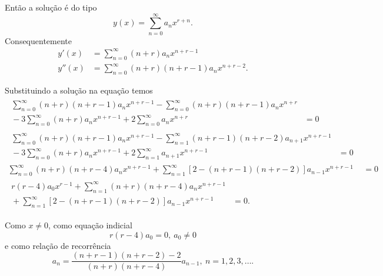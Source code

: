 \documentclass[a4paper,12pt, leqno, answers]{exam}
\begin{document}
\begin{questions}
\begin{solution}
        Ent\~{a}o a solu\c{c}\~{a}o \'{e} do tipo
        \[
        y(x) = \sum_{n = 0}^\infty a_n x^{r + n}.
        \]
        Consequentemente
        \begin{align*}
            y'(x) &= \sum_{n = 0}^\infty \left( n + r \right) a_n x^{n + r - 1} \\
            y''(x) &= \sum_{n = 0}^\infty \left( n + r \right) \left( n + r - 1 \right) a_n x^{n + r - 2}.
        \end{align*}

        Substituindo a solu\c{c}\~{a}o na equa\c{c}\~{a}o temos
        \begin{align*}
            \begin{split}
                \sum_{n = 0}^\infty \left( n + r \right) \left( n + r - 1 \right) a_n x^{n + r - 1} - \sum_{n = 0}^\infty \left( n + r \right) \left( n + r - 1 \right) a_n x^{n + r} \\  {}- 3 \sum_{n = 0}^\infty \left( n + r \right) a_n x^{n + r - 1} + 2 \sum_{n = 0}^\infty a_n x^{n + r} &= 0
            \end{split} \\
            \begin{split}
                \sum_{n = 0}^\infty \left( n + r \right) \left( n + r - 1 \right) a_n x^{n + r - 1} - \sum_{n = 1}^\infty \left( n + r - 1 \right) \left( n + r - 2 \right) a_{n + 1} x^{n + r - 1} \\  {}- 3 \sum_{n = 0}^\infty \left( n + r \right) a_n x^{n + r - 1} + 2 \sum_{n = 1}^\infty a_{n + 1} x^{n + r - 1} &= 0
            \end{split} \\
            \sum_{n = 0}^\infty \left( n + r \right) \left( n + r - 4 \right) a_n x^{n + r - 1} + \sum_{n = 1}^\infty \left[ 2 - \left( n + r - 1 \right) \left( n + r - 2 \right) \right] a_{n - 1} x^{n + r - 1} &= 0 \\
            \begin{split}
                r \left( r - 4 \right) a_0 x^{r - 1} + \sum_{n = 1}^\infty \left( n + r \right) \left( n + r - 4 \right) a_n x^{n + r - 1} \\ {}+ \sum_{n = 1}^\infty \left[ 2 - \left( n + r - 1 \right) \left( n + r - 2 \right) \right] a_{n - 1} x^{n + r - 1} &= 0.
            \end{split}
        \end{align*}

        Como $x \neq 0$, como equa\c{c}\~{a}o indicial
        \[
        r \left( r - 4 \right) a_0 = 0, \ a_0 \neq 0
        \]
        e como rela\c{c}\~{a}o de recorr\^{e}ncia
        \[
        a_n = \frac{\left( n + r - 1 \right) \left( n + r - 2 \right) - 2}{\left( n + r \right) \left( n + r - 4 \right)} a_{n - 1}, \ n = 1, 2, 3, \ldots.
        \]


\end{solution}
\end{questions}
\end{document}
